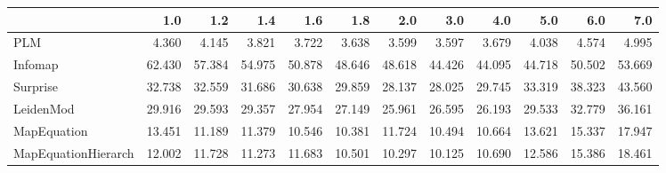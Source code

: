 \begin{tabular}{lrrrrrrrrrrr}
\toprule
{} &    1.0 &    1.2 &    1.4 &    1.6 &    1.8 &    2.0 &    3.0 &    4.0 &    5.0 &    6.0 &    7.0 \\
\midrule
PLM                 &  4.360 &  4.145 &  3.821 &  3.722 &  3.638 &  3.599 &  3.597 &  3.679 &  4.038 &  4.574 &  4.995 \\
Infomap             & 62.430 & 57.384 & 54.975 & 50.878 & 48.646 & 48.618 & 44.426 & 44.095 & 44.718 & 50.502 & 53.669 \\
Surprise            & 32.738 & 32.559 & 31.686 & 30.638 & 29.859 & 28.137 & 28.025 & 29.745 & 33.319 & 38.323 & 43.560 \\
LeidenMod           & 29.916 & 29.593 & 29.357 & 27.954 & 27.149 & 25.961 & 26.595 & 26.193 & 29.533 & 32.779 & 36.161 \\
MapEquation         & 13.451 & 11.189 & 11.379 & 10.546 & 10.381 & 11.724 & 10.494 & 10.664 & 13.621 & 15.337 & 17.947 \\
MapEquationHierarch & 12.002 & 11.728 & 11.273 & 11.683 & 10.501 & 10.297 & 10.125 & 10.690 & 12.586 & 15.386 & 18.461 \\
\bottomrule
\end{tabular}
